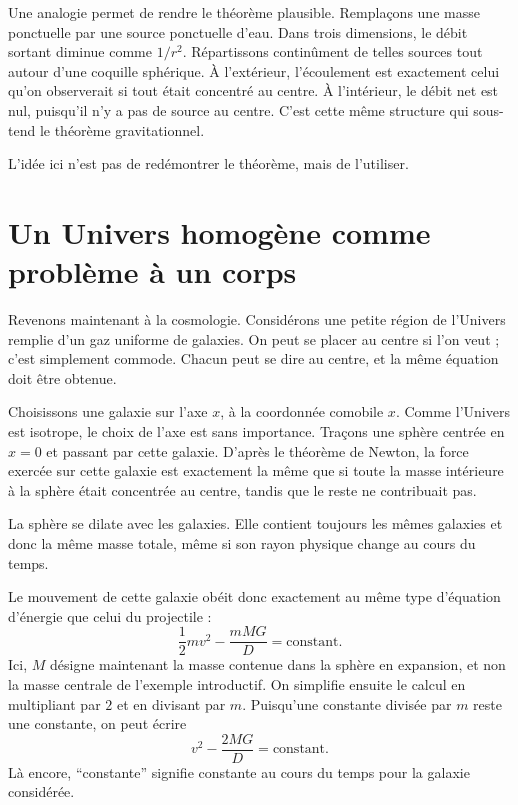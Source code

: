 Une analogie permet de rendre le théorème plausible. Remplaçons une masse ponctuelle par une source ponctuelle d’eau. Dans trois dimensions, le débit sortant diminue comme \(1/r^2\). Répartissons continûment de telles sources tout autour d’une coquille sphérique. À l’extérieur, l’écoulement est exactement celui qu’on observerait si tout était concentré au centre. À l’intérieur, le débit net est nul, puisqu’il n’y a pas de source au centre. C’est cette même structure qui sous-tend le théorème gravitationnel.

L’idée ici n’est pas de redémontrer le théorème, mais de l’utiliser.

\section{Un Univers homogène comme problème à un corps}

Revenons maintenant à la cosmologie. Considérons une petite région de l’Univers remplie d’un gaz uniforme de galaxies. On peut se placer au centre si l’on veut ; c’est simplement commode. Chacun peut se dire au centre, et la même équation doit être obtenue.

Choisissons une galaxie sur l’axe \(x\), à la coordonnée comobile \(x\). Comme l’Univers est isotrope, le choix de l’axe est sans importance. Traçons une sphère centrée en \(x=0\) et passant par cette galaxie. D’après le théorème de Newton, la force exercée sur cette galaxie est exactement la même que si toute la masse intérieure à la sphère était concentrée au centre, tandis que le reste ne contribuait pas.

La sphère se dilate avec les galaxies. Elle contient toujours les mêmes galaxies et donc la même masse totale, même si son rayon physique change au cours du temps.

Le mouvement de cette galaxie obéit donc exactement au même type d’équation d’énergie que celui du projectile :
\begin{equation}
\frac{1}{2}mv^2-\frac{mMG}{D}=\text{constant}.
\end{equation}
Ici, \(M\) désigne maintenant la masse contenue dans la sphère en expansion, et non la masse centrale de l’exemple introductif. On simplifie ensuite le calcul en multipliant par \(2\) et en divisant par \(m\). Puisqu’une constante divisée par \(m\) reste une constante, on peut écrire
\begin{equation}
v^2-\frac{2MG}{D}=\text{constant}.
\end{equation}
Là encore, ``constante'' signifie constante au cours du temps pour la galaxie considérée.


